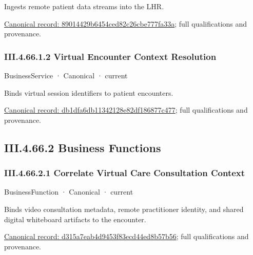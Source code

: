 Ingests remote patient data streams into the LHR.


{\footnotesize \href{../../../../continuum/business/business-service/89014429b6454ced82c26cbe777fa33a.md}{Canonical record: 89014429b6454ced82c26cbe777fa33a}; full qualifications and provenance.}\par
\subsubsection*{III.4.66.1.2 Virtual Encounter Context Resolution}
\label{navigation:III.4.66.1.2}

\label{element:db1dfa6db11342128e82df186877c477}
{\small BusinessService · Canonical · current}\par

Binds virtual session identifiers to patient encounters.


{\footnotesize \href{../../../../continuum/business/business-service/db1dfa6db11342128e82df186877c477.md}{Canonical record: db1dfa6db11342128e82df186877c477}; full qualifications and provenance.}\par
\subsection*{III.4.66.2 Business Functions}
\label{navigation:III.4.66.2}

\subsubsection*{III.4.66.2.1 Correlate Virtual Care Consultation Context}
\label{navigation:III.4.66.2.1}

\label{element:d315a7eab4d9453f83ecd44ed8b57b56}
{\small BusinessFunction · Canonical · current}\par

Binds video consultation metadata, remote practitioner identity, and shared digital whiteboard artifacts to the encounter.


{\footnotesize \href{../../../../continuum/business/business-function/d315a7eab4d9453f83ecd44ed8b57b56.md}{Canonical record: d315a7eab4d9453f83ecd44ed8b57b56}; full qualifications and provenance.}\par
